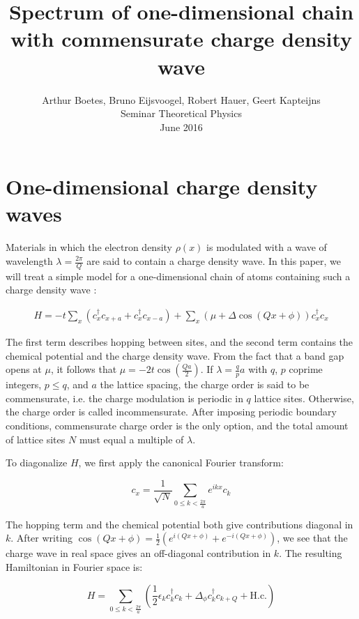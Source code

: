 \documentclass[letterpaper, 10 pt, conference]{ieeeconf}  %
\title{\LARGE \bf
  Spectrum of one-dimensional chain with commensurate charge density wave
}
\author{Arthur Boetes, Bruno Eijsvoogel, Robert Hauer, Geert Kapteijns\\
Seminar Theoretical Physics\\
June 2016
}
\begin{document}
\maketitle
\thispagestyle{empty}
\pagestyle{empty}


\section{One-dimensional charge density waves}

Materials in which the electron density $\rho(x)$ is modulated with a wave of
wavelength $\lambda = \frac{2\pi}{Q}$ are said to contain a charge density wave.
In this paper, we will treat a simple model for a one-dimensional chain of atoms containing such a charge density wave \cite{flicker2015}:

\begin{align}
H = -t \sum_x (c_x^{\dagger}c_{x+a} + c_x^{\dagger}c_{x-a}) + \sum_x (\mu + \Delta \cos(Qx + \phi))c_x^{\dagger}c_x
\end{align}

The first term describes hopping between sites, and the second term contains the chemical potential and the charge density wave. From the fact that a band gap opens at $\mu$, it follows that $\mu = -2t\cos(\frac{Qa}{2})$.
If $\lambda = \frac{q}{p} a$ with $q$, $p$ coprime integers, $p \leq q$, and $a$ the lattice spacing, the charge order is said to be commensurate, i.e. the charge modulation is periodic in $q$ lattice sites. Otherwise, the charge order is called incommensurate.
After imposing periodic boundary conditions, commensurate charge order is the only option, and the total amount of lattice sites $N$ must equal a multiple of $\lambda$.

To diagonalize $H$, we first apply the canonical Fourier transform:

$$c_x = \frac{1}{\sqrt{N}}\sum_{0 \leq k < \frac{2\pi}{a}}e^{ikx}c_k$$

The hopping term and the chemical potential both give contributions diagonal in $k$. After writing $\cos(Qx + \phi) = \frac{1}{2}(e^{i(Qx + \phi)} + e^{-i(Qx + \phi)}) $, we see that the charge wave in real space gives an off-diagonal contribution in $k$. The resulting Hamiltonian in Fourier space is:

$$ H = \sum_{0 \leq k < \frac{2\pi}{a}} (\frac{1}{2}\epsilon_k c_k^{\dagger}c_k + \Delta_\phi c_k^{\dagger}c_{k+Q} + \text{H.c.}) $$
\end{document}
